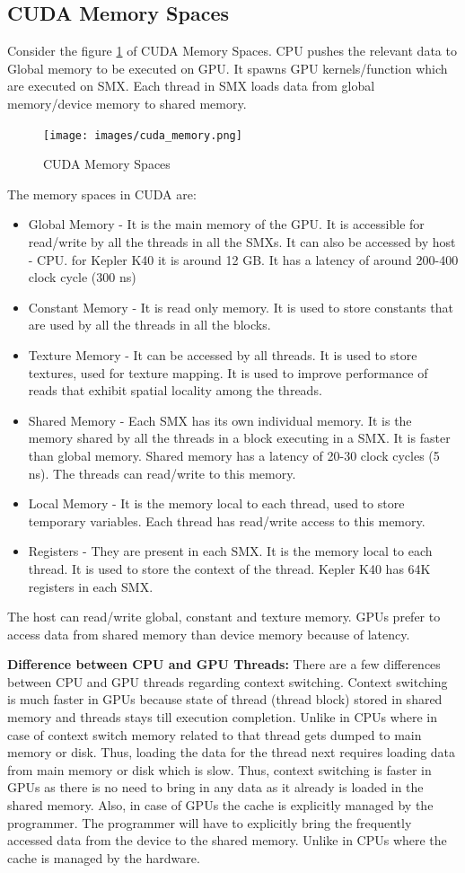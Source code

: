 \documentclass[12pt]{article}
\begin{document}
\subsection{CUDA Memory Spaces}
Consider the figure \ref{fig:cuda_memory} of CUDA Memory Spaces. CPU pushes the relevant data to Global memory to be executed on GPU.
It spawns GPU kernels/function which are executed on SMX. Each thread in SMX loads data from global memory/device memory to shared memory.
\begin{figure}[H]
    \centering
    \texttt{[image: images/cuda\_memory.png]}
    \caption{CUDA Memory Spaces}
    \label{fig:cuda_memory}
\end{figure}
The memory spaces in CUDA are:
\begin{itemize}
    \item Global Memory - It is the main memory of the GPU. It is accessible for read/write by all the threads in all the SMXs. 
    It can also be accessed by host - CPU. for Kepler K40 it is around 12 GB. It has a latency of around 200-400 clock cycle (300 ns)
    \item Constant Memory - It is read only memory. It is used to store constants that are used by all the threads in all the blocks.
    \item Texture Memory - It can be accessed by all threads. It is used to store textures, used for texture mapping. It is used to improve performance of reads that exhibit spatial locality among the threads.
    \item Shared Memory - Each SMX has its own individual memory. It is the memory shared by all the threads in a block executing in a SMX. It is faster than global memory. Shared memory has a latency of 20-30 clock cycles (5 ns). The threads can read/write to this memory.
    \item Local Memory - It is the memory local to each thread, used to store temporary variables. Each thread has read/write access to this memory.
    \item Registers - They are present in each SMX. It is the memory local to each thread. It is used to store the context of the thread. Kepler K40 has 64K registers in each SMX.
\end{itemize}
The host can read/write global, constant and texture memory. GPUs prefer to access data from shared memory than device memory because of latency.

\textbf{Difference between CPU and GPU Threads: }There are a few differences between CPU and GPU threads regarding context switching.
Context switching is much faster in GPUs because state of thread (thread block) stored in shared memory and threads stays till execution completion. Unlike in CPUs
where in case of context switch memory related to that thread gets dumped to main memory or disk. Thus, loading the data for the thread next requires loading data from main memory or disk which is 
slow. Thus, context switching is faster in GPUs as there is no need to bring in any data as it already is loaded in the shared memory. Also, in case
of GPUs the cache is explicitly managed by the programmer. The programmer will have to explicitly bring the frequently accessed data from the device to the shared memory. Unlike
in CPUs where the cache is managed by the hardware.
\end{document}
